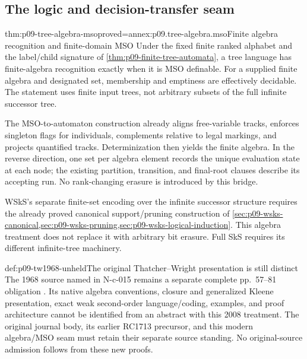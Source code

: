\subsection{The logic and decision-transfer seam}
\label{sec:p09-tree-algebra-logic-seam}

\begin{hbcorollary}{thm:p09-tree-algebra-mso}{proved=annex:p09.tree-algebra.mso}{Finite algebra recognition and finite-domain MSO}
Under the fixed finite ranked alphabet and the label/child signature of
\cref{thm:p09-finite-tree-automata}, a tree language has finite-algebra
recognition exactly when it is MSO definable.
For a supplied finite algebra and designated set, membership and emptiness
are effectively decidable. The statement uses finite input trees, not
arbitrary subsets of the full infinite successor tree.
\end{hbcorollary}

The MSO-to-automaton construction already aligns free-variable tracks,
enforces singleton flags for individuals, complements relative to legal
markings, and projects quantified tracks. Determinization then yields
the finite algebra. In the reverse direction, one set per algebra element
records the unique evaluation state at each node; the existing partition,
transition, and final-root clauses describe its accepting run.
No rank-changing erasure is introduced by this bridge.

WSkS's separate finite-set encoding over the infinite successor structure
requires the already proved canonical support/pruning construction of
\cref{sec:p09-wsks-canonical,sec:p09-wsks-pruning,sec:p09-wsks-logical-induction}.
This algebra treatment does not replace it with arbitrary bit erasure.
Full SkS requires its different infinite-tree machinery.

\begin{proofboundary}{def:p09-tw1968-unheld}{The original Thatcher--Wright presentation is still distinct}
The 1968 source named in N-c-015 remains a separate complete
pp.~57--81 obligation \parencite{ThatcherWright1968}.
Its native algebra conventions, closure and generalized Kleene
presentation, exact weak second-order language/coding, examples, and
proof architecture cannot be identified from an abstract with this
2008 treatment. The original journal body, its earlier RC1713 precursor,
and this modern algebra/MSO seam must retain their separate source
standing. No original-source admission follows from these new proofs.
\end{proofboundary}
